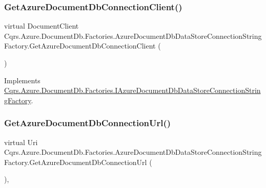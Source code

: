 \subsubsection{\texorpdfstring{Get\+Azure\+Document\+Db\+Connection\+Client()}{GetAzureDocumentDbConnectionClient()}}
{\footnotesize\ttfamily virtual Document\+Client Cqrs.\+Azure.\+Document\+Db.\+Factories.\+Azure\+Document\+Db\+Data\+Store\+Connection\+String\+Factory.\+Get\+Azure\+Document\+Db\+Connection\+Client (\begin{DoxyParamCaption}{ }\end{DoxyParamCaption})\hspace{0.3cm}{\ttfamily [virtual]}}



Implements \hyperlink{interfaceCqrs_1_1Azure_1_1DocumentDb_1_1Factories_1_1IAzureDocumentDbDataStoreConnectionStringFactory_ad5207c6dfcb6496aa9fb731b6453a1ee}{Cqrs.\+Azure.\+Document\+Db.\+Factories.\+I\+Azure\+Document\+Db\+Data\+Store\+Connection\+String\+Factory}.

\mbox{\label{classCqrs_1_1Azure_1_1DocumentDb_1_1Factories_1_1AzureDocumentDbDataStoreConnectionStringFactory_af5d090f6195c7b59183db1eec8dcafc0}} 
\subsubsection{\texorpdfstring{Get\+Azure\+Document\+Db\+Connection\+Url()}{GetAzureDocumentDbConnectionUrl()}}
{\footnotesize\ttfamily virtual Uri Cqrs.\+Azure.\+Document\+Db.\+Factories.\+Azure\+Document\+Db\+Data\+Store\+Connection\+String\+Factory.\+Get\+Azure\+Document\+Db\+Connection\+Url (\begin{DoxyParamCaption}{ }\end{DoxyParamCaption})\hspace{0.3cm}{\ttfamily [protected]}, {\ttfamily [virtual]}}

